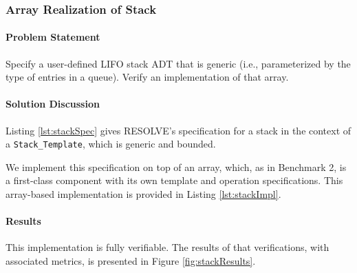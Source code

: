 		\subsubsection{Array Realization of Stack}	

\paragraph{Problem Statement}Specify a user-defined LIFO stack ADT that is generic (i.e., parameterized by the type of entries in a queue). Verify an implementation of that array.

\paragraph{Solution Discussion}Listing \ref{lst:stackSpec} gives RESOLVE's specification for a stack in the context of a \texttt{Stack\_Template}, which is generic and bounded.



We implement this specification on top of an array, which, as in Benchmark 2, is a first-class component with its own template and operation specifications.  This array-based implementation is provided in Listing \ref{lst:stackImpl}.



\paragraph{Results}This implementation is fully verifiable.  The results of that verifications, with associated metrics, is presented in Figure \ref{fig:stackResults}.

